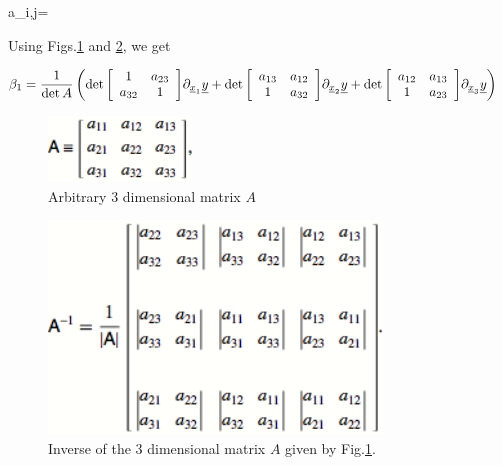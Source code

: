 \begin{enumerate}
\beq
a_{i,j}=
\eeq

Using Figs.\ref{fig-3dim-matrix}
and \ref{fig-3dim-matrix-inv}, we get

\begin{align}
\beta_1&=
\frac{1}{\det A}
\left(
\det{\left[
\begin{array}{cc}
1&a_{23}
\\
a_{32}&1
\end{array}
\right]}\partial_{{\underline{x}}_1}{\underline{y}}
+
\det{\left[
\begin{array}{cc}
a_{13}&a_{12}
\\
1&a_{32}
\end{array}
\right]}\partial_{{\underline{x}}_2}{\underline{y}}
+
\det{\left[
\begin{array}{cc}
a_{12}&a_{13}
\\
1&a_{23}
\end{array}
\right]}\partial_{{\underline{x}}_3}{\underline{y}}
\right)
\end{align}

\begin{figure}[h!]
\centering
\includegraphics[width=1.5in]
{conventions/3d-matrix.png}
\caption{Arbitrary 3 dimensional matrix $A$}
\label{fig-3dim-matrix}
\end{figure}


\begin{figure}[h!]
\centering
\includegraphics[width=3.5in]
{conventions/3d-matrix-inv.png}
\caption{Inverse of the 3 dimensional matrix $A$
given by Fig.\ref{fig-3dim-matrix}.}
\label{fig-3dim-matrix-inv}
\end{figure}






\end{enumerate}







